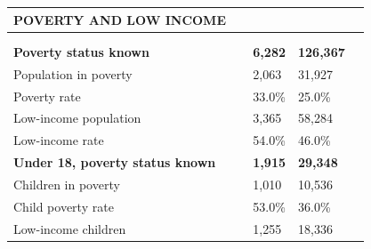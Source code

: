 \documentclass[9pt]{report}
\begin{document}
\vspace{12pt}
\setlength{\tabcolsep}{.01in} %
\begin{tabular}{p{.10in}p{.10in}p{.10in}p{3.7in}>{\hfill}p{.85in}>{\hfill}p{.85in}>{\hfill}p{.85in}>{\hfill}p{.85in}p{0.1in}}
\multicolumn{9}{l}{\parbox{7.1in}{\raggedright{\large{\strut\textbf{POVERTY AND LOW INCOME}\strut}}}} \\ 
\hline
\multicolumn{4}{l}{\parbox{3.5in}{\raggedright{\textbf{}}}} & \multicolumn{1}{r}{\parbox{.85in}{\strut\raggedleft{\textbf{}\strut}}} & \multicolumn{1}{r}{\parbox{.85in}{\strut\raggedleft{\textbf{}\strut}}} & \multicolumn{1}{r}{\parbox{.85in}{\strut{}}} & \multicolumn{1}{r}{\parbox{.85in}{\strut{}}} & \\ 
\multicolumn{9}{l}{} \\ 
\multicolumn{4}{l}{\parbox{3.5in}{\strut\raggedright{\textbf{Poverty status known}\strut}}} & \textbf{} & \textbf{} & \textbf{6,282} & \textbf{126,367} & \textbf{} \\ 
\multicolumn{4}{l}{\parbox{3.6in}{\strut\raggedright{{Population in poverty}}\strut}} &  &  & 2,063 & 31,927 & \multicolumn{1}{l}{}  \\ 
\multicolumn{4}{l}{\parbox{3.6in}{\strut\raggedright{{Poverty rate}}\strut}} &  &  & 33.0\% & 25.0\% & \multicolumn{1}{l}{}  \\ 
\multicolumn{4}{l}{\parbox{3.6in}{\strut\raggedright{{Low-income population}}\strut}} &  &  & 3,365 & 58,284 & \multicolumn{1}{l}{}  \\ 
\multicolumn{4}{l}{\parbox{3.6in}{\strut\raggedright{{Low-income rate}}\strut}} &  &  & 54.0\% & 46.0\% & \multicolumn{1}{l}{}  \\ 
\multicolumn{4}{l}{\parbox{3.5in}{\strut\raggedright{\textbf{Under 18, poverty status known}\strut}}} & \textbf{} & \textbf{} & \textbf{1,915} & \textbf{29,348} & \textbf{} \\ 
\multicolumn{4}{l}{\parbox{3.6in}{\strut\raggedright{{Children in poverty}}\strut}} &  &  & 1,010 & 10,536 & \multicolumn{1}{l}{}  \\ 
\multicolumn{4}{l}{\parbox{3.6in}{\strut\raggedright{{Child poverty rate}}\strut}} &  &  & 53.0\% & 36.0\% & \multicolumn{1}{l}{}  \\ 
\multicolumn{4}{l}{\parbox{3.6in}{\strut\raggedright{{Low-income children}}\strut}} &  &  & 1,255 & 18,336 & \multicolumn{1}{l}{}  \\ 

\end{tabular}
\end{document}
